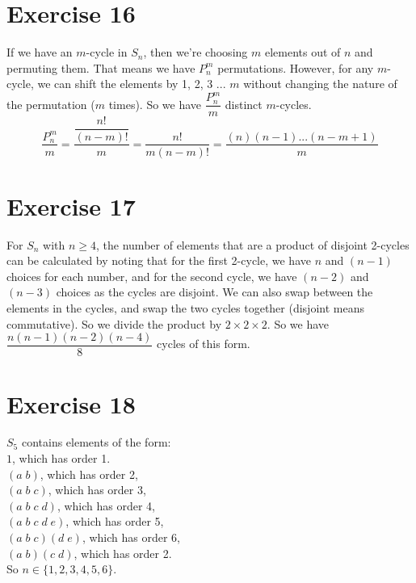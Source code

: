 \documentclass{article}
\begin{document}
    
    \section*{Exercise 16}
    If we have an $m$-cycle in $S_n$,
    then we're choosing $m$ elements out of $n$ and permuting them.
    That means we have $P_n^m$ permutations.
    However, for any $m$-cycle, we can shift the elements by 1, 2, 3 ... $m$
    without changing the nature of the permutation ($m$ times).
    So we have $\dfrac{P_n^m}{m}$ distinct $m$-cycles.
    \[ \dfrac{P_n^m}{m} = \dfrac{\dfrac{n!}{(n - m)!}}{m}
    = \dfrac{n!}{m(n - m)!} = \dfrac{(n)(n-1)...(n - m + 1)}{m} \]


    \section*{Exercise 17}
    For $S_n$ with $n \geqslant 4$, the number of elements that are a
    product of disjoint 2-cycles can be calculated by noting that
    for the first 2-cycle, we have $n$ and $(n-1)$ choices for each number,
    and for the second cycle, we have $(n-2)$ and $(n-3)$ choices as
    the cycles are disjoint. We can also swap between the elements in the
    cycles, and swap the two cycles together (disjoint means commutative).
    So we divide the product by $2 \times 2 \times 2$.
    So we have $\dfrac{n(n-1)(n-2)(n-4)}{8}$ cycles of this form.


    \section*{Exercise 18}
    $S_5$ contains elements of the form: \\ 
    $1$, which has order 1. \\
    $(a\;b)$, which has order 2, \\
    $(a\;b\;c)$, which has order 3, \\
    $(a\;b\;c\;d)$, which has order 4, \\
    $(a\;b\;c\;d\;e)$, which has order 5, \\
    $(a\;b\;c)(d\;e)$, which has order 6, \\
    $(a\;b)(c\;d)$, which has order 2. \\
    So $n \in \{ 1, 2, 3, 4, 5, 6 \}$.
\end{document}
